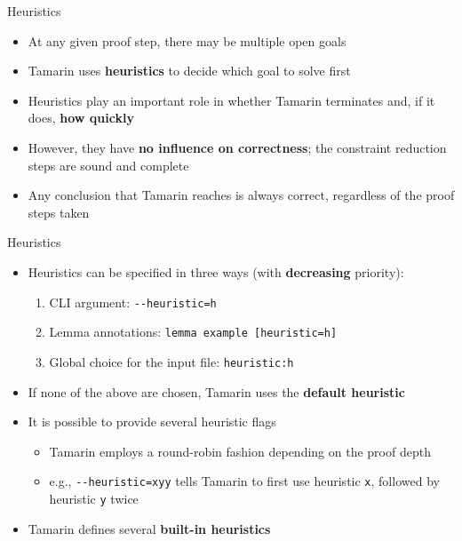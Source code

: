 \documentclass[11pt,aspectratio=169]{beamer}
\begin{document}
\begin{frame}[fragile]{Heuristics}
    \begin{itemize}
        \item At any given proof step, there may be multiple open goals
        \item Tamarin uses \textbf{heuristics} to decide which goal to solve 
              first
        \item Heuristics play an important role in whether Tamarin terminates 
              and, if it does, \textbf{how quickly}
        \item However, they have \textbf{no influence on correctness}; the 
              constraint reduction steps are sound and complete
        \item Any conclusion that Tamarin reaches is always correct, regardless 
              of the proof steps taken
    \end{itemize}
\end{frame}

\begin{frame}[fragile]{Heuristics}
    \begin{itemize}
        \item Heuristics can be specified in three ways (with
              \textbf{decreasing} priority):
        \begin{enumerate}
            \item CLI argument: \verb|--heuristic=h|
            \item Lemma annotations: \verb|lemma example [heuristic=h]|
            \item Global choice for the input file: \verb|heuristic:h|
        \end{enumerate}
        \item If none of the above are chosen, Tamarin uses the
              \textbf{default heuristic}
        \item It is possible to provide several heuristic flags
        \begin{itemize}
            \item Tamarin employs a round-robin fashion depending on the proof 
                  depth
            \item e.g., \verb|--heuristic=xyy| tells Tamarin to first use 
                  heuristic \verb|x|, followed by heuristic \verb|y| twice
        \end{itemize}
        \item Tamarin defines several \textbf{built-in heuristics}
    \end{itemize}
\end{frame}
\end{document}
